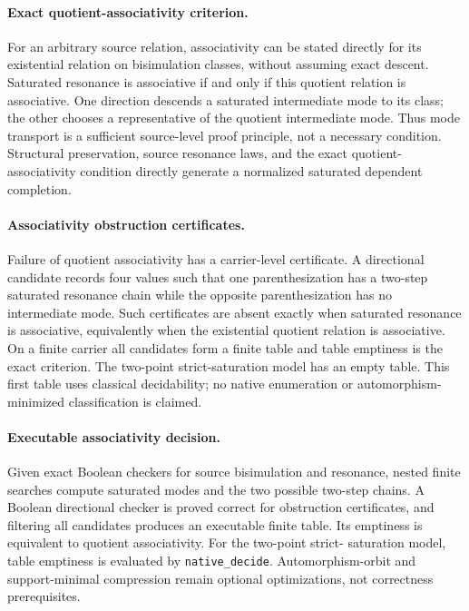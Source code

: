 \documentclass[11pt]{article}
\theoremstyle{definition}
\begin{document}
\paragraph{Exact quotient-associativity criterion.}
For an arbitrary source relation, associativity can be stated directly for its
existential relation on bisimulation classes, without assuming exact descent.
Saturated resonance is associative if and only if this quotient relation is
associative.  One direction descends a saturated intermediate mode to its
class; the other chooses a representative of the quotient intermediate mode.
Thus mode transport is a sufficient source-level proof principle, not a
necessary condition.  Structural preservation, source resonance laws, and the
exact quotient-associativity condition directly generate a normalized
saturated dependent completion.

\paragraph{Associativity obstruction certificates.}
Failure of quotient associativity has a carrier-level certificate.  A
directional candidate records four values such that one parenthesization has a
two-step saturated resonance chain while the opposite parenthesization has no
intermediate mode.  Such certificates are absent exactly when saturated
resonance is associative, equivalently when the existential quotient relation
is associative.  On a finite carrier all candidates form a finite table and
table emptiness is the exact criterion.  The two-point strict-saturation model
has an empty table.  This first table uses classical decidability; no native
enumeration or automorphism-minimized classification is claimed.

\paragraph{Executable associativity decision.}
Given exact Boolean checkers for source bisimulation and resonance, nested
finite searches compute saturated modes and the two possible two-step chains.
A Boolean directional checker is proved correct for obstruction certificates,
and filtering all candidates produces an executable finite table.  Its
emptiness is equivalent to quotient associativity.  For the two-point strict-
saturation model, table emptiness is evaluated by \texttt{native\_decide}.
Automorphism-orbit and support-minimal compression remain optional
optimizations, not correctness prerequisites.
\end{document}
